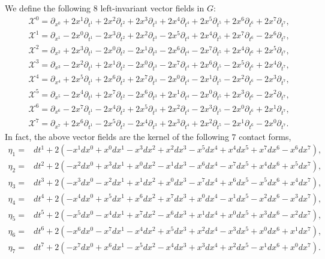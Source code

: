 \documentclass[reqno,12pt]{amsart}
\numberwithin{equation}{section}
\theoremstyle{plain}
\theoremstyle{definition}
\begin{document}
We define the following $8$ left-invariant vector fields in $G$:
\small{\begin{align*}
&\mathscr{X}^0=\partial_{x^0}+2x^1 \partial_{t^1}+2x^2 \partial_{t^2}+2x^3 \partial_{t^3}+2x^4 \partial_{t^4}+2x^5 \partial_{t^5}+2x^6 \partial_{t^6}+2x^7 \partial_{t^7},\\
&\mathscr{X}^1 =\partial_{x^1}-2x^0 \partial_{t^1}-2x^3 \partial_{t^2}+2x^2 \partial_{t^3}-2x^5 \partial_{t^4}+2x^4 \partial_{t^5}+2x^7 \partial_{t^6}-2x^6  \partial_{t^7},\\
&\mathscr{X}^2=\partial_{x^2}+2x^3 \partial_{t^1}-2x^0 \partial_{t^2}-2x^1 \partial_{t^3}-2x^6\partial_{t^4}-2x^7\partial_{t^5}+2x^4\partial_{t^6}+2x^5 \partial_{t^7},\\
&\mathscr{X}^3=\partial_{x^3}-2x^2\partial_{t^1}+2x^1 \partial_{t^2}-2x^0 \partial_{t^3}-2x^7 \partial_{t^4}+2x^6 \partial_{t^5}-2x^5 \partial_{t^6}+2x^4 \partial_{t^7},\\
&\mathscr{X}^4=\partial_{x^4}+2x^5 \partial_{t^1}+2x^6 \partial_{t^2}+2x^7 \partial_{t^3}-2x^0\partial_{t^4}-2x^1 \partial_{t^5}-2x^2 \partial_{t^6}-2x^3\partial_{t^7},\\
&\mathscr{X}^5=\partial_{x^5}-2x^4 \partial_{t^1}+2x^7 \partial_{t^2}-2x^6 \partial_{t^3}+2x^1 \partial_{t^4}-2x^0\partial_{t^5}+2x^3\partial_{t^6}-2x^2 \partial_{t^7},\\
&\mathscr{X}^6=\partial_{x^6}-2x^7 \partial_{t^1}-2x^4\partial_{t^2}+2x^5\partial_{t^3}+2x^2 \partial_{t^4}-2x^3 \partial_{t^5}-2x^0\partial_{t^6}+2x^1 \partial_{t^7},\\
&\mathscr{X}^7=\partial_{x^7}+2x^6 \partial_{t^1}-2x^5 \partial_{t^2}-2x^4 \partial_{t^3}+2x^3 \partial_{t^4}+2x^2 \partial_{t^5}-2x^1 \partial_{t^6}-2x^0 \partial_{t^7}.   
 \end{align*}}
In fact, the above vector fields are the kernel of the following $7$ contact forms,
\small{\begin{align*}
    \eta_1=&dt^1+2(-x^1 dx^0+x^0 dx^1-x^3 dx^2+x^2 dx^3-x^5dx^4+x^4 dx^5+x^7 dx^6-x^6 dx^7),\\
    \eta_2=&dt^2+2(-x^2 dx^0+x^3 dx^1+x^0 dx^2-x^1dx^3-x^6 dx^4-x^7 dx^5+x^4 dx^6+x^5 dx^7),\\
    \eta_3=&dt^3+2(-x^3dx^0-x^2 dx^1+x^1dx^2+x^0 dx^3-x^7 dx^4+x^6dx^5-x^5 dx^6+x^4 dx^7),\\
    \eta_4=&dt^4+2(-x^4 dx^0+x^5dx^1+x^6 dx^2+x^7 dx^3+x^0 dx^4-x^1dx^5-x^2dx^6-x^3 dx^7),\\
    \eta_5=&dt^5+2(-x^5 dx^0-x^4dx^1+x^7 dx^2-x^6 dx^3+x^1 dx^4+x^0 dx^5+x^3 dx^6-x^2 dx^7),\\
    \eta_6=&dt^6+2(-x^6 dx^0-x^7 dx^1-x^4dx^2+x^5 dx^3+x^2dx^4-x^3 dx^5+x^0 dx^6+x^1 dx^7),\\
    \eta_7=&dt^7+2(-x^7 dx^0+x^6 dx^1-x^5 dx^2-x^4 dx^3+x^3 dx^4+x^2 dx^5-x^1 dx^6+x^0 dx^7).
    \end{align*}}
\end{document}
